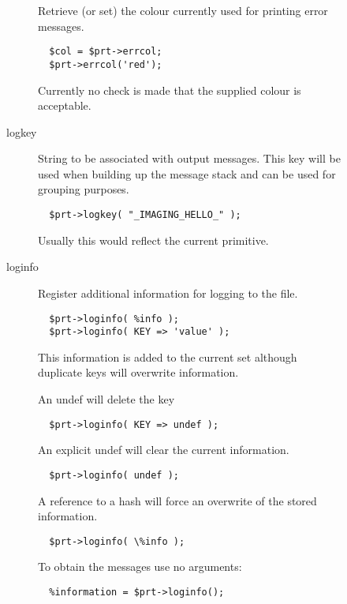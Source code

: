 \begin{description}
\begin{description}
\begin{description}
Retrieve (or set) the colour currently used for printing error
messages.

\begin{verbatim}
  $col = $prt->errcol;
  $prt->errcol('red');
\end{verbatim}


Currently no check is made that the supplied colour is acceptable.


\item[{logkey}] \mbox{}

String to be associated with output messages. This key will be used when
building up the message stack and can be used for grouping purposes.

\begin{verbatim}
  $prt->logkey( "_IMAGING_HELLO_" );
\end{verbatim}


Usually this would reflect the current primitive.


\item[{loginfo}] \mbox{}

Register additional information for logging to the file.

\begin{verbatim}
  $prt->loginfo( %info );
  $prt->loginfo( KEY => 'value' );
\end{verbatim}


This information is added to the current set although duplicate keys will
overwrite information.



An undef will delete the key

\begin{verbatim}
  $prt->loginfo( KEY => undef );
\end{verbatim}


An explicit undef will clear the current information.

\begin{verbatim}
  $prt->loginfo( undef );
\end{verbatim}


A reference to a hash will force an overwrite of the stored information.

\begin{verbatim}
  $prt->loginfo( \%info );
\end{verbatim}


To obtain the messages use no arguments:

\begin{verbatim}
  %information = $prt->loginfo();
\end{verbatim}



\end{description}
\end{description}
\end{description}
